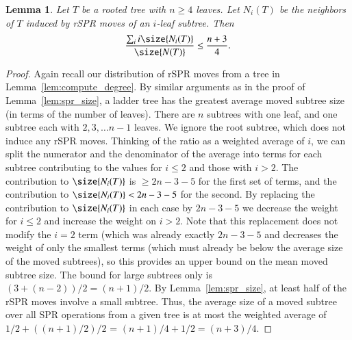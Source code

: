 \documentclass[]{elsarticle}
\newtheorem{lem}[thm]{Lemma}
\begin{document}
\begin{lem}
	Let $T$ be a rooted tree with $n \ge 4$ leaves.
	Let $N_i(T)$ be the neighbors of $T$ induced by rSPR moves of an $i$-leaf subtree.
	Then $$\frac{\sum_i i \size{N_i(T)}}{\size{N(T)}} \le \frac{n + 3}{4} .$$
	\label{lem:spr_size_mean}
\end{lem}
\begin{proof}
	Again recall our distribution of rSPR moves from a tree in Lemma~\ref{lem:compute_degree}.
	By similar arguments as in the proof of Lemma~\ref{lem:spr_size}, a ladder tree has the greatest average moved subtree size (in terms of the number of leaves).
	There are $n$ subtrees with one leaf, and one subtree each with $2,3, \ldots n - 1$ leaves.
	We ignore the root subtree, which does not induce any rSPR moves.
	Thinking of the ratio as a weighted average of $i$, we can split the numerator and the denominator of the average into terms for each subtree contributing to the values for $i \leq 2$ and those with $i > 2$.
    The contribution to $\size{N_i(T)}$ is $\geq 2n - 3 - 5$ for the first set of terms, and the contribution to $\size{N_i(T)} < 2n - 3 - 5$ for the second.
		By replacing the contribution to $\size{N_i(T)}$ in each case by $2n-3-5$ we decrease the weight for $i \leq 2$ and increase the weight on $i > 2$.
		Note that this replacement does not modify the $i = 2$ term (which was already exactly $2n - 3 - 5$ and decreases the weight of only the smallest terms (which must already be below the average size of the moved subtrees), so this provides an upper bound on the mean moved subtree size.
	The bound for large subtrees only is $(3 + (n-2)) / 2 = (n + 1) / 2$.
	By Lemma~\ref{lem:spr_size}, at least half of the rSPR moves involve a small subtree.
	Thus, the average size of a moved subtree over all SPR operations from a given tree is at most the weighted average of $1 / 2 + ((n + 1) / 2) / 2$ = $(n + 1) / 4 + 1 / 2 = (n + 3) / 4$.


\end{proof}
\end{document}
